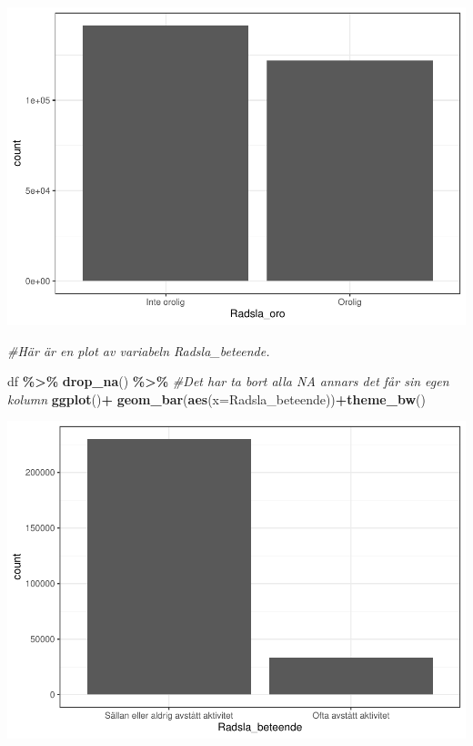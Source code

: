 \documentclass[
]{book}
\newenvironment{Shaded}{\begin{snugshade}}{\end{snugshade}}
\newcommand{\AttributeTok}[1]{\textcolor[rgb]{0.13,0.29,0.53}{#1}}
\newcommand{\CommentTok}[1]{\textcolor[rgb]{0.56,0.35,0.01}{\textit{#1}}}
\newcommand{\FunctionTok}[1]{\textcolor[rgb]{0.13,0.29,0.53}{\textbf{#1}}}
\newcommand{\NormalTok}[1]{#1}
\newcommand{\SpecialCharTok}[1]{\textcolor[rgb]{0.81,0.36,0.00}{\textbf{#1}}}
\begin{document}
\includegraphics{_main_files/figure-latex/unnamed-chunk-7-1.pdf}

\begin{Shaded}
\begin{Highlighting}[]
\CommentTok{\#Här är en plot av variabeln \textquotesingle{}Radsla\_beteende\textquotesingle{}.  }

\NormalTok{df }\SpecialCharTok{\%\textgreater{}\%} \FunctionTok{drop\_na}\NormalTok{() }\SpecialCharTok{\%\textgreater{}\%} \CommentTok{\#Det har ta bort alla NA annars det får sin egen kolumn}
  \FunctionTok{ggplot}\NormalTok{()}\SpecialCharTok{+} \FunctionTok{geom\_bar}\NormalTok{(}\FunctionTok{aes}\NormalTok{(}\AttributeTok{x=}\NormalTok{Radsla\_beteende))}\SpecialCharTok{+}\FunctionTok{theme\_bw}\NormalTok{()}
\end{Highlighting}
\end{Shaded}

\includegraphics{_main_files/figure-latex/unnamed-chunk-8-1.pdf}
\end{document}
